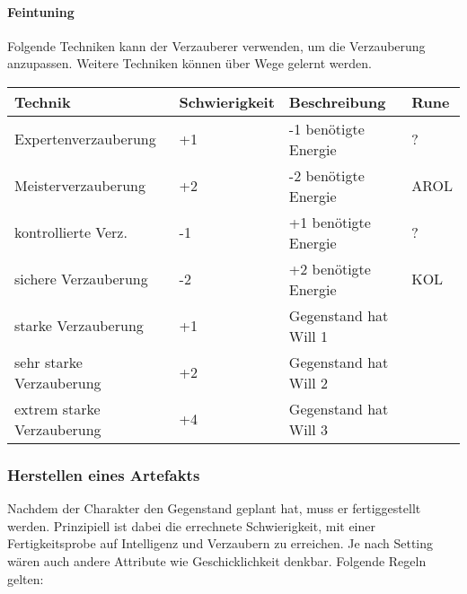 \documentclass{article}
\begin{document}
\paragraph{Feintuning}

Folgende Techniken kann der Verzauberer verwenden, um die Verzauberung anzupassen. Weitere Techniken können über Wege
gelernt werden.


\begin{small}
\begin{tabular}{|m{4cm}|m{3cm}|m{4cm}|m{2cm}|}
\hline
\textbf{Technik}&\textbf{Schwierigkeit}&\textbf{Beschreibung}&\textbf{Rune}\\
\hline
\hline
Expertenverzauberung&+1&-1 benötigte Energie&?\\
\hline
Meisterverzauberung&+2&-2 benötigte Energie&AROL\\
\hline
kontrollierte Verz.&-1&+1 benötigte Energie&?\\
\hline
sichere Verzauberung&-2&+2 benötigte Energie&KOL\\
\hline
starke Verzauberung&+1&Gegenstand hat Will 1& \\
\hline
sehr starke Verzauberung&+2&Gegenstand hat Will 2& \\
\hline
extrem starke Verzauberung&+4&Gegenstand hat Will 3& \\
\hline
\end{tabular}
\end{small}

\subsubsection{Herstellen eines Artefakts}

Nachdem der Charakter den Gegenstand geplant hat, muss er fertiggestellt werden. Prinzipiell ist dabei die
errechnete Schwierigkeit, mit einer Fertigkeitsprobe auf Intelligenz und Verzaubern zu erreichen. Je nach Setting
wären auch andere Attribute wie Geschicklichkeit denkbar. Folgende Regeln gelten:
\end{document}
